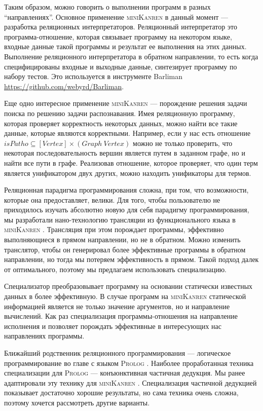 \documentclass{article}
\newcommand{\miniKanren}{\textsc{miniKanren }}
\newcommand{\prolog}{\textsc{Prolog }}
\begin{document}
Таким образом, можно говорить о выполнении программ в разных ``направлениях''. 
Основное применение \miniKanren в данный момент --- разработка реляционных интерпретаторов.
Реляционный интерпретатор это программа-отношение, которая связывает программу на некотором языке, входные данные такой программы и результат ее выполнения на этих данных. 
Выполнение реляционного интерпретатора в обратном направлении, то есть когда специфицированы входные и выходные данные, синтезирует программу по набору тестов. 
Это используется в инструменте Barliman \url{https://github.com/webyrd/Barliman}.

Еще одно интересное применение \miniKanren --- порождение решения задачи поиска по решению задачи распознавания. 
Имея реляционную программу, которая проверяет корректность некоторых данных, можно найти все такие данные, которые являются корректными. 
Например, если у нас есть отношение $isPatho \subseteq [Vertex] \times (Graph \ Vertex)$ можно не только проверить, что некоторая последовательность вершин является путем в заданном графе, но и найти все пути в графе. 
Реализовав отношение, которое проверяет, что один терм является унификатором двух других, можно находить унификаторы для термов.  

Реляционная парадигма программирования сложна, при том, что возможности, которые она предоставляет, велики. 
Для того, чтобы пользователю не приходилось изучать абсолютно новую для себя парадигму программирования, мы разработали нано-технологию трансляции из функционального языка в \miniKanren. 
Трансляция при этом порождает программы, эффективно выполняющиеся в прямом направлении, но не в обратном. 
Можно изменить транслятор, чтобы он генерировал более эффективные программы в обратном направлении, но тогда мы потеряем эффективность в прямом. 
Такой подход далек от оптимального, поэтому мы предлагаем использовать специализацию.

Специализатор преобразовывает программу на основании статически известных данных в более эффективную. 
В случае программ на \miniKanren статической информацией является не только значение аргументов, но и направление вычислений. 
Как раз специализация программы-отношения на направление исполнения и позволяет порождать эффективные в интересующих нас направлениях программы.

Ближайший родственник реляционного программирования --- логическое программирование во главе с языком \prolog. 
Наиболее проработанная техника специализации для \prolog --- конъюнктивная частичная дедукция. 
Мы ранее адаптировали эту технику для \miniKanren. 
Специализация частичной дедукцией показывает достаточно хорошие результаты, но сама техника очень сложна, поэтому хочется рассмотреть другие варианты. 
\end{document}

